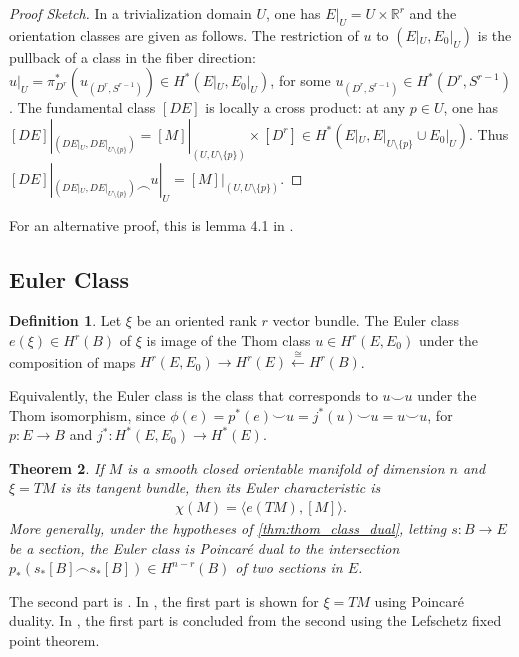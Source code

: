 \documentclass{scrartcl}
\theoremstyle{plain}
\newtheorem{theorem}{Theorem}[section]
\theoremstyle{definition}
\newtheorem{definition}[theorem]{Definition}
\newcommand{\R}{\mathbb R}
\newcommand{\union}{\mathbin{\cup}}
\newcommand{\capp}{\mathbin{\frown}}
\newcommand{\cupp}{\mathbin{\smile}}
\newcommand{\iso}{\cong}
\begin{document}
\begin{proof}[Proof Sketch]
    In a trivialization domain $U$, one has $E|_U = U \times \R^r$ and the orientation classes are given as follows. The restriction of $u$ to $(E|_U, E_0|_U)$ is the pullback of a class in the fiber direction: $u|_U = \pi_{D^r}^{*}\left(u_{(D^r, S^{r-1})}\right)\in H^*(E|_U, E_0|_U)$, for some $u_{(D^r, S^{r-1})}\in H^*(D^r, S^{r-1})$. The fundamental class $[DE]$ is locally a cross product: at any $p\in U$, one has $[DE]|_{(DE|_U, DE|_{U\setminus\{p\}})} = [M]|_{(U, U\setminus\{p\})} \times [D^r] \in H^*(E|_U, E|_{U\setminus\{p\}} \union E_0|_{U})$. Thus $[DE]|_{(DE|_U, DE|_{U\setminus\{p\}})} \capp u|_U = [M]|_{(U, U\setminus\{p\})}$.
\end{proof}

For an alternative proof, this is lemma 4.1 in \cite{hutchings2011cup}. 


\subsection{Euler Class}\label{subsec:euler_class}
\begin{definition}
    Let $\xi$ be an oriented rank $r$ vector bundle. The Euler class $e(\xi)\in H^r(B)$ of $\xi$ is image of the Thom class $u\in H^r(E, E_0)$ under the composition of maps $H^r(E, E_0)\to H^r(E)\xleftarrow{\iso} H^r(B)$.
\end{definition}
Equivalently, the Euler class is the class that corresponds to $u\cupp u$ under the Thom isomorphism, since $\phi(e) = p^*(e) \cupp u = j^*(u)\cupp u = u\cupp u$, for $p\colon E\to B$ and $j^*\colon H^*(E, E_0) \to H^*(E)$. 
\begin{theorem}\label{thm:euler_class}
    If $M$ is a smooth closed orientable manifold of dimension $n$ and $\xi=TM$ is its tangent bundle, then its Euler characteristic is 
    \begin{align*}
        \chi(M) = \langle e(TM), [M]\rangle.
    \end{align*}
    More generally, under the hypotheses of \ref{thm:thom_class_dual}, letting $s\colon B\to E$ be a section, the Euler class is Poincaré dual to the intersection $p_*(s_*[B]\capp s_*[B])\in H^{n-r}(B)$ of two sections in $E$.
\end{theorem}

The second part is \cite[Thm 5.2]{hutchings2011cup}.
In \cite{milnor1974characteristic}, the first part is shown for $\xi=TM$ using Poincaré duality. In \cite{hutchings2011cup}, the first part is concluded from the second using the Lefschetz fixed point theorem.
\end{document}
